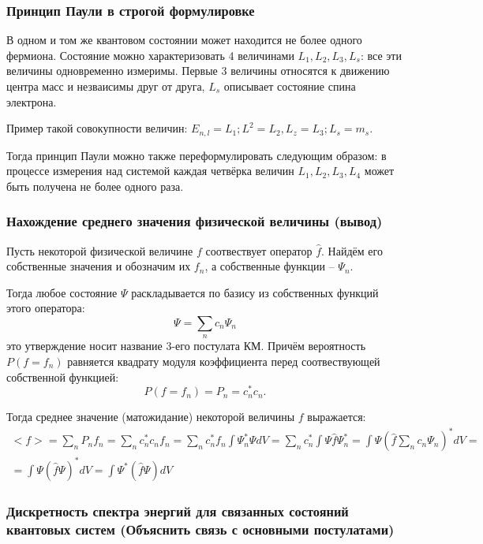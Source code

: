\subsubsection{Принцип Паули в строгой формулировке}

В одном и том же квантовом состоянии может находится не более одного фермиона. Состояние можно
характеризовать 4 величинами $L_1, L_2, L_3, L_s$: все эти величины одновременно измеримы. Первые
3 величины относятся к движению центра масс и незваисимы друг от друга, $L_s$ описывает состояние
спина электрона. 

Пример такой совокупности величин: $E_{n, l} = L_1; L^2 = L_2, L_z = L_3; L_s = m_s$.

Тогда принцип Паули можно также переформулировать следующим образом: в процессе измерения над 
системой каждая четвёрка величин $L_1, L_2, L_3, L_4$ может быть получена не более одного раза.

\subsubsection{Нахождение среднего значения физической величины (вывод)}

Пусть некоторой физической величине $f$ соотвествует оператор $\hat{f}$. Найдём его собственные значения и обозначим их $f_n$, а собственные функции -- $\Psi_n$.

Тогда любое состояние $\Psi$ раскладывается по базису из собственных функций этого оператора:
\[
  \Psi = \sum_n c_n \Psi_n
\]
это утверждение носит название 3-его постулата КМ. Причём вероятность $P(f = f_n)$ равняется квадрату модуля коэффициента перед соотвествующей собственной функцией:
\[
  P(f = f_n) = P_n = c_n^* c_n.
\]

Тогда среднее значение (матожидание) некоторой величины $f$ выражается:
\begin{multline*}
  <f> = \sum_n P_n f_n
  = \sum_n c_n^* c_n f_n
  = \sum_n c_n^* f_n \int \Psi_n^* \Psi dV
  = \sum_n c_n^* \int \Psi \hat{f} \Psi_n^*
  = \int \Psi (\hat{f} \sum_n c_n \Psi_n)^* dV = \\
  = \int \Psi (\hat{f} \Psi)^* dV
  = \int \Psi^* (\hat{f} \Psi) dV
\end{multline*}

\subsubsection{Дискретность спектра энергий для связанных состояний квантовых систем
(Объяснить связь с основными постулатами)}

